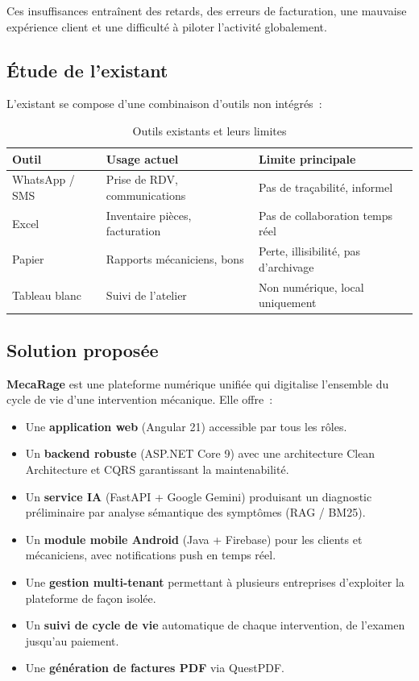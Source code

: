 \documentclass[12pt,a4paper]{report}
\begin{document}
\noindent Ces insuffisances entraînent des retards, des erreurs de facturation,
une mauvaise expérience client et une difficulté à piloter l'activité globalement.

\subsection{Étude de l'existant}

L'existant se compose d'une combinaison d'outils non intégrés~:

\begin{table}[H]
\centering
\caption{Outils existants et leurs limites}
\begin{tabularx}{\textwidth}{|l|X|X|}
\hline
\rowcolor{indigolite!30}
\textbf{Outil} & \textbf{Usage actuel} & \textbf{Limite principale} \\
\hline
WhatsApp / SMS & Prise de RDV, communications & Pas de traçabilité, informel \\
\hline
Excel & Inventaire pièces, facturation & Pas de collaboration temps réel \\
\hline
Papier & Rapports mécaniciens, bons & Perte, illisibilité, pas d'archivage \\
\hline
Tableau blanc & Suivi de l'atelier & Non numérique, local uniquement \\
\hline
\end{tabularx}
\end{table}

\subsection{Solution proposée}

\textbf{MecaRage} est une plateforme numérique unifiée qui digitalise l'ensemble du
cycle de vie d'une intervention mécanique. Elle offre~:

\begin{itemize}[noitemsep]
  \item Une \textbf{application web} (Angular 21) accessible par tous les rôles.
  \item Un \textbf{backend robuste} (ASP.NET Core 9) avec une architecture Clean
    Architecture et CQRS garantissant la maintenabilité.
  \item Un \textbf{service IA} (FastAPI + Google Gemini) produisant un diagnostic
    préliminaire par analyse sémantique des symptômes (RAG / BM25).
  \item Un \textbf{module mobile Android} (Java + Firebase) pour les clients et
    mécaniciens, avec notifications push en temps réel.
  \item Une \textbf{gestion multi-tenant} permettant à plusieurs entreprises
    d'exploiter la plateforme de façon isolée.
  \item Un \textbf{suivi de cycle de vie} automatique de chaque intervention, de
    l'examen jusqu'au paiement.
  \item Une \textbf{génération de factures PDF} via QuestPDF.
\end{itemize}
\end{document}
